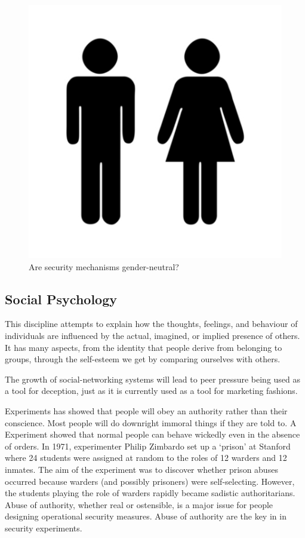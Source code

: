 		\begin{figure}[H]
			\centering
			\includegraphics[scale=0.4]{pics/gender.jpg}
			\caption{Are security mechanisms gender-neutral?}
		\end{figure}

	\clearpage
	\subsection*{Social Psychology}
		This discipline attempts to explain how the thoughts, feelings, and behaviour
		of individuals are influenced by the actual, imagined, or implied presence of
		others. It has many aspects, from the identity that people derive from belonging
		to groups, through the self-esteem we get by comparing ourselves with others.

		The growth of social-networking systems will
		lead to peer pressure being used as a tool for deception, just as it is currently
		used as a tool for marketing fashions.

		Experiments has showed that people will obey an authority rather than their conscience. 
		Most people will do downright immoral things if they are told to.
		A Experiment showed that normal people can behave wickedly even in the absence of orders. 
		In 1971, experimenter Philip Zimbardo set up a ‘prison’ at Stanford where 24 students
		were assigned at random to the roles of 12 warders and 12 inmates. The aim
		of the experiment was to discover whether prison abuses occurred because
		warders (and possibly prisoners) were self-selecting. However, the students
		playing the role of warders rapidly became sadistic authoritarians.
		Abuse of authority, whether real or ostensible, is a major issue for people
		designing operational security measures. Abuse of authority are the key in 
		in security experiments. 

